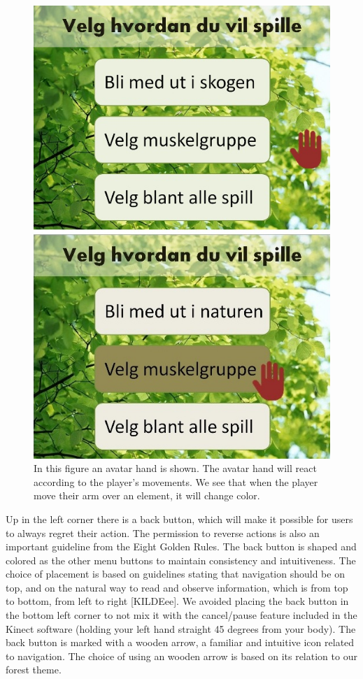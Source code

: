\begin{figure} [ht!]
\centering
\includegraphics[scale=0.5]{menuAvatarAction.jpg}
\caption[Menu - Action and response]{In this figure an avatar hand is shown. The avatar hand will react according to the player's movements. We see that when the player move their arm over an element, it will change color.}
\label{fig:avatarAction}
\end{figure} 

Up in the left corner there is a back button, which will make it possible for users to always regret their action. The permission to reverse actions is also an important guideline from the Eight Golden Rules. The back button is shaped and colored as the other menu buttons to maintain consistency and intuitiveness. The choice of placement is based on guidelines stating that navigation should be on top, and on the natural way to read and observe information, which is from top to bottom, from left to right [KILDEee]. We avoided placing the back button in the bottom left corner to not mix it with the cancel/pause feature included in the Kinect software (holding your left hand straight 45 degrees from your body). The back button is marked with a wooden arrow, a familiar and intuitive icon related to navigation. The choice of using an wooden arrow is based on its relation to our forest theme. 

